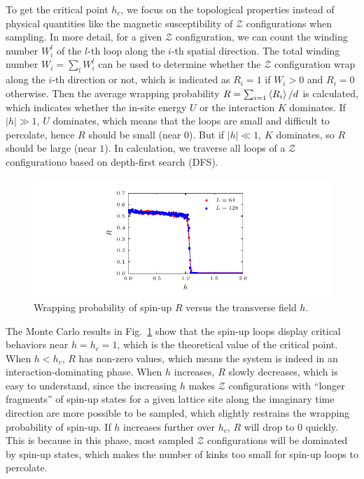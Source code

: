 \documentclass{article}
\theoremstyle{plain} \newtheorem{thm}{Theorem}[section]
\theoremstyle{definition} \newtheorem{df}{Definition}[section]
\theoremstyle{definition} \newtheorem{eg}{Example}
\theoremstyle{remark} \newtheorem*{rmk}{Remark}
\begin{document}
To get the critical point $h_c$, we focus on the topological properties instead of physical quantities like the magnetic susceptibility of $\mathcal{Z}$ configurations when sampling. In more detail, for a given $\mathcal{Z}$ configuration, we can count the winding number $W_i^l$ of the $l$-th loop along the $i$-th spatial direction. The total winding number $W_i = \sum_{l}W_i^l$ can be used to determine whether the $\mathcal{Z}$ configuration wrap along the $i$-th direction or not, which is indicated as $R_i = 1$ if $W_i > 0$ and $R_i = 0$ otherwise. Then the average wrapping probability $R = \sum_{i=1}\braket{R_i}/d$ is calculated, which indicates whether the in-site energy $U$ or the interaction $K$ dominates. If $|h| \gg 1$, $U$ dominates, which means that the loops are small and difficult to percolate, hence $R$ should be small (near $0$). But if $|h| \ll 1$, $K$ dominates, so $R$ should be large (near $1$). In calculation, we traverse all loops of a $\mathcal{Z}$ configurationo based on depth-first search (DFS).

\begin{figure}[htpb]
  \centering
  \includegraphics[width=\textwidth]{figs/wrapping_probability.pdf}
  \caption{Wrapping probability of spin-up $R$ versus the transverse field $h$.}
  \label{fig:wrapping_probability}
\end{figure}

The Monte Carlo results in Fig.~\ref{fig:wrapping_probability} show that the spin-up loops display critical behaviors near $h = h_c = 1$, which is the theoretical value of the critical point. When $h < h_c$, $R$ has non-zero values, which means the system is indeed in an interaction-dominating phase. When $h$ increases, $R$ slowly decreases, which is easy to understand, since the increasing $h$ makes $\mathcal{Z}$ configurations with ``longer fragments'' of spin-up states for a given lattice site along the imaginary time direction are more possible to be sampled, which slightly restrains the wrapping probability of spin-up. If $h$ increases further over $h_c$, $R$ will drop to $0$ quickly. This is because in this phase, most sampled $\mathcal{Z}$ configurations will be dominated by spin-up states, which makes the number of kinks too small for spin-up loops to percolate.
\end{document}
